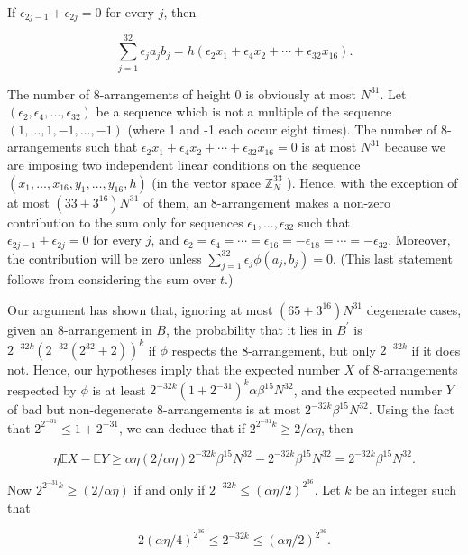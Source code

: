 \documentclass[10pt]{article}
\begin{document}
If $\epsilon_{2 j-1}+\epsilon_{2 j}=0$ for every $j$, then

$$
\sum_{j=1}^{32} \epsilon_{j} a_{j} b_{j}=h\left(\epsilon_{2} x_{1}+\epsilon_{4} x_{2}+\cdots+\epsilon_{32} x_{16}\right) .
$$

The number of 8-arrangements of height 0 is obviously at most $N^{31}$. Let $\left(\epsilon_{2}, \epsilon_{4}, \ldots, \epsilon_{32}\right)$ be a sequence which is not a multiple of the sequence $(1, \ldots, 1,-1, \ldots,-1)$ (where 1 and -1 each occur eight times). The number of 8-arrangements such that $\epsilon_{2} x_{1}+\epsilon_{4} x_{2}+\cdots+\epsilon_{32} x_{16}=0$ is at most $N^{31}$ because we are imposing two independent linear conditions on the sequence $\left(x_{1}, \ldots, x_{16}, y_{1}, \ldots, y_{16}, h\right)$ (in the vector space $\mathbb{Z}_{N}^{33}$ ). Hence, with the exception of at most $\left(33+3^{16}\right) N^{31}$ of them, an 8-arrangement makes a non-zero contribution to the sum only for sequences $\epsilon_{1}, \ldots, \epsilon_{32}$ such that\\
$\epsilon_{2 j-1}+\epsilon_{2 j}=0$ for every $j$, and $\epsilon_{2}=\epsilon_{4}=\cdots=\epsilon_{16}=-\epsilon_{18}=\cdots=-\epsilon_{32}$. Moreover, the contribution will be zero unless $\sum_{j=1}^{32} \epsilon_{j} \phi\left(a_{j}, b_{j}\right)=0$. (This last statement follows from considering the sum over $t$.)

Our argument has shown that, ignoring at most $\left(65+3^{16}\right) N^{31}$ degenerate cases, given an 8-arrangement in $B$, the probability that it lies in $B^{\prime}$ is $2^{-32 k}\left(2^{-32}\left(2^{32}+2\right)\right)^{k}$ if $\phi$ respects the 8-arrangement, but only $2^{-32 k}$ if it does not. Hence, our hypotheses imply that the expected number $X$ of 8-arrangements respected by $\phi$ is at least $2^{-32 k}\left(1+2^{-31}\right)^{k} \alpha \beta^{15} N^{32}$, and the expected number $Y$ of bad but non-degenerate 8-arrangements is at most $2^{-32 k} \beta^{15} N^{32}$. Using the fact that $2^{2^{-31}} \leqslant 1+2^{-31}$, we can deduce that if $2^{2^{-31} k} \geqslant 2 / \alpha \eta$, then

$$
\eta \mathbb{E} X-\mathbb{E} Y \geqslant \alpha \eta(2 / \alpha \eta) 2^{-32 k} \beta^{15} N^{32}-2^{-32 k} \beta^{15} N^{32}=2^{-32 k} \beta^{15} N^{32} .
$$

Now $2^{2^{-31} k} \geqslant(2 / \alpha \eta)$ if and only if $2^{-32 k} \leqslant(\alpha \eta / 2)^{2^{36}}$. Let $k$ be an integer such that

$$
2(\alpha \eta / 4)^{2^{36}} \leqslant 2^{-32 k} \leqslant(\alpha \eta / 2)^{2^{36}} .
$$
\end{document}
